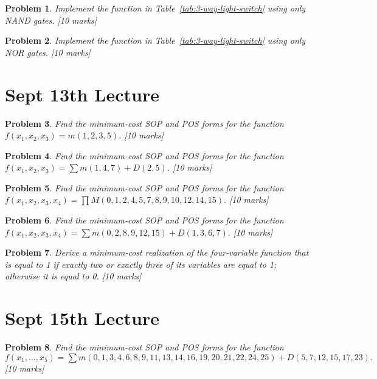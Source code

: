 \documentclass[twocolumn]{article}
\newtheorem{prob}{Problem}
\begin{document}
\begin{prob}
 Implement the function in Table~\ref{tab:3-way-light-switch} using only NAND
 gates. [10 marks]
\end{prob}

\begin{prob}
 Implement the function in Table~\ref{tab:3-way-light-switch} using only NOR
 gates. [10 marks]
\end{prob}

\section{Sept 13th Lecture}

\begin{prob}
Find the minimum-cost SOP and POS forms for the function $f(x_1 , x_2 , x_3 ) =
m(1, 2, 3, 5)$. \cite[Prob 2.37]{brown2013fundamentals} [10 marks]
\label{prob:237}
\end{prob}

\begin{prob}
Find the minimum-cost SOP and POS forms for the function $f(x_1 , x_2 , x_3) =
\sum m(1, 4, 7) + D(2, 5)$. \cite[Prob 2.38]{brown2013fundamentals} [10 marks]
\end{prob}

\begin{prob}
Find the minimum-cost SOP and POS forms for the function $f(x_1 , x_2 , x_3,
x_4) = \prod M(0, 1, 2, 4, 5, 7, 8, 9, 10, 12, 14, 15).$ \cite[Prob
2.39]{brown2013fundamentals} [10 marks]
\end{prob}

\begin{prob}
Find the minimum-cost SOP and POS forms for the function $f(x_1 , x_2 , x_3, x_4) =
\sum m(0, 2, 8, 9, 12, 15) + D(1, 3, 6, 7).$ \cite[Prob
2.40]{brown2013fundamentals} [10 marks]
\end{prob}

\begin{prob}
Derive a minimum-cost realization of the four-variable function that is equal to 1 if exactly
two or exactly three of its variables are equal to 1; otherwise it is equal to
0. \cite[Prob 2.46]{brown2013fundamentals} [10 marks]
\end{prob}

\section{Sept 15th Lecture}
\begin{prob}
  Find the minimum-cost SOP and POS forms for the function $f(x_1 , \dots, x_5) =
  \sum m(0, 1, 3, 4, 6, 8, 9, 11, 13, 14, 16, 19, 20, 21, 22, 24, 25) + D(5, 7,
  12, 15, 17, 23).$  \cite[Prob 2.42]{brown2013fundamentals} [10 marks]
\end{prob}



\end{document}
